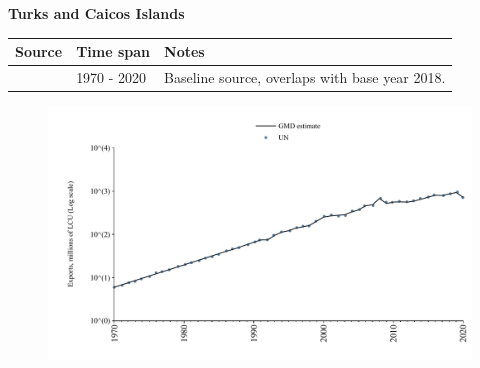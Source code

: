 \documentclass[12pt,a4paper,landscape]{article}
\begin{document}
\begin{adjustbox}{max totalsize={\paperwidth}{\paperheight},center}
\begin{minipage}[t][\textheight][t]{\textwidth}
\vspace*{0.5cm}
{}
\begin{center}
{\Large\bfseries Turks and Caicos Islands}
\end{center}
\vspace{0.5cm}
\begin{table}[H]
\centering
\small
\begin{tabular}{|l|l|l|}
\hline
\textbf{Source} & \textbf{Time span} & \textbf{Notes} \\
\hline
\rowcolor{white}\cite{UN}& 1970 - 2020 &Baseline source, overlaps with base year 2018.\\
\hline
\end{tabular}
\end{table}
\begin{figure}[H]
\centering
\includegraphics[width=\textwidth,height=0.6\textheight,keepaspectratio]{graphs/TCA_exports.pdf}
\end{figure}
\end{minipage}
\end{adjustbox}
\end{document}
